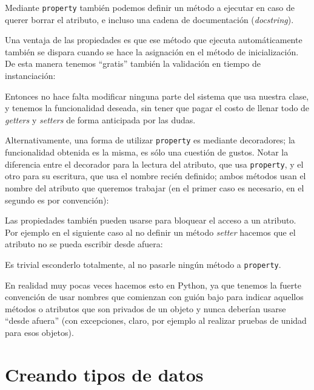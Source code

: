 
Mediante \texttt{property} también podemos definir un método a ejecutar en caso de querer borrar el atributo, e incluso una cadena de documentación (\textit{docstring}).

Una ventaja de las propiedades es que ese método que ejecuta automáticamente también se dispara cuando se hace la asignación en el método de inicialización. De esta manera tenemos ``gratis'' también la validación en tiempo de instanciación:


Entonces no hace falta modificar ninguna parte del sistema que usa nuestra clase, y tenemos la funcionalidad deseada, sin tener que pagar el costo de llenar todo de \textit{getters} y \textit{setters} de forma anticipada por las dudas.

Alternativamente, una forma de utilizar \texttt{property} es mediante decoradores; la funcionalidad obtenida es la misma, es sólo una cuestión de gustos. Notar la diferencia entre el decorador para la lectura del atributo, que usa \texttt{property}, y el otro para su escritura, que usa el nombre recién definido; ambos métodos usan el nombre del atributo que queremos trabajar (en el primer caso es necesario, en el segundo es por convención):


Las propiedades también pueden usarse para bloquear el acceso a un atributo. Por ejemplo en el siguiente caso al no definir un método \textit{setter} hacemos que el atributo no se pueda escribir desde afuera:


Es trivial esconderlo totalmente, al no pasarle ningún método a \texttt{property}.

En realidad muy pocas veces hacemos esto en Python, ya que tenemos la fuerte convención de usar nombres que comienzan con guión bajo para indicar aquellos métodos o atributos que son privados de un objeto y nunca deberían usarse ``desde afuera'' (con excepciones, claro, por ejemplo al realizar pruebas de unidad para esos objetos).


\section{Creando tipos de datos}

